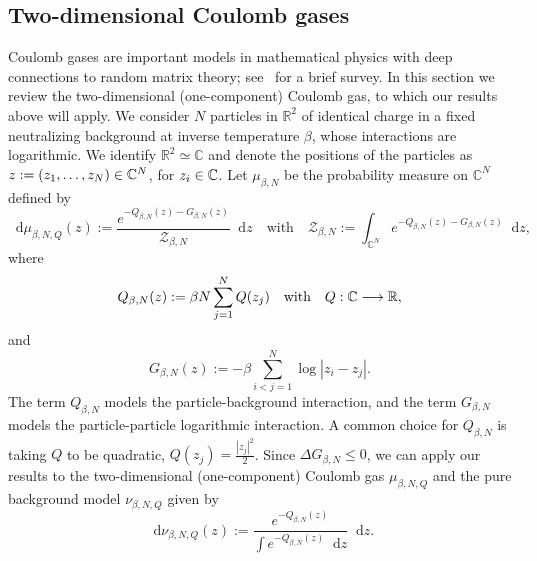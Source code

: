 \documentclass[AHL,Unicode,longabstracts]{cedram}
\newcommand{\R}{\mathbb R}
\newcommand{\C}{\mathbb C}
\newcommand{\source}{\mu}
\newcommand{\target}{\nu}
\newcommand*\diff{\mathop{}\!\mathrm{d}}
\newcommand{\clZ}{\mathcal{Z}}
\renewcommand*{\to}{\mathchoice{\longrightarrow}{\rightarrow}{\rightarrow}{\rightarrow}}
\let\oldin\in
\renewcommand{\in}{\mathchoice{\oldin}{\oldin}{\,\oldin\,}{\,\oldin\,}}
\begin{document}
\subsection{Two-dimensional Coulomb gases}\label{subsec:plasma_intro}
Coulomb gases are important models in mathematical physics with deep connections to random matrix theory; see~\cite{MR4619310} for a brief survey. In this section we review the two-dimensional (one-component) Coulomb gas, to which our results above will apply. We consider $N$ particles in $\R^2$ of identical charge in a fixed neutralizing background at inverse temperature $\beta$, whose interactions are logarithmic. We identify $\R^2 \simeq\C$ and denote the positions of the particles as $z:=(z_1,\ldots,z_N)\in\C^N$, for $z_i\in \C$. Let $\source_{\beta,N}$ be the probability measure on $\C^{N}$ defined by
\begin{equation}\label{eq:mu_betaN}
\diff \source_{\beta,N,Q}(z):=\frac{e^{-Q_{\beta,N}(z)-G_{\beta,N}(z)}}{\clZ_{\beta, N}}\diff z\quad \text{with}\quad \clZ_{\beta, N}:=\int_{\C^N}e^{-Q_{\beta,N}(z)-G_{\beta,N}(z)}\diff z,
\end{equation}
where
\begin{equation}\label{eq:Q_betaN}
Q_{\beta,N}(z):=\beta N\sum_{j=1}^NQ(z_j)\quad\text{with}\quad Q:\C\to \R,
\end{equation}
and
\begin{equation}\label{eq:G_betaN}
G_{\beta,N}(z):=-\beta \sum_{i<j=1}^N\log |z_i-z_j|.
\end{equation}
The term $Q_{\beta,N}$ models the particle-background interaction, and the term $G_{\beta,N}$ models the particle-particle logarithmic interaction. A common choice for $Q_{\beta,N}$ is taking $Q$ to be quadratic, $Q(z_j)=\frac{|z_j|^2}{2}$. Since $\Delta G_{\beta,N}\le 0$, we can apply our results to the two-dimensional (one-component) Coulomb gas $\source_{\beta,N,Q}$ and the pure background model $\target_{\beta,N,Q}$ given by
\[
\diff \target_{\beta,N,Q}(z):=\frac{e^{-Q_{\beta,N}(z)}}{\int e^{-Q_{\beta,N}(z)}\diff z}\diff z.
\]
\end{document}

